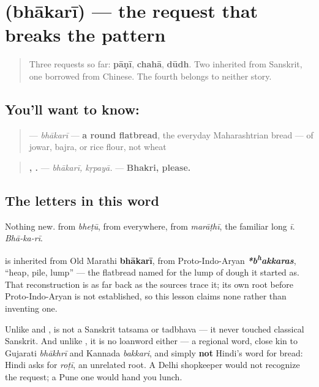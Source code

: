 \section[\texorpdfstring{\mr{भाकरी} (bhākarī)}{भाकरी (bhākarī)}]{ (bhākarī) — the request that breaks the pattern}

\label{lesson:MR-C10-bhakari}



\begin{quote}
Three requests so far: \textbf{pāṇī}, \textbf{chahā}, \textbf{dūdh}. Two inherited from Sanskrit, one borrowed from Chinese. The fourth belongs to neither story.
\end{quote}

\subsection*{You'll want to know: }
\begin{quote}
\textbf{} — \emph{bhākarī} — \textbf{a round flatbread}, the everyday Maharashtrian bread — of jowar, bajra, or rice flour, not wheat
\end{quote}

\begin{quote}
\textbf{, .} — \emph{bhākarī, kṛpayā.} — \textbf{Bhakri, please.}
\end{quote}

\subsection*{The letters in this word}
Nothing new. \textbf{} from \emph{bheṭū}, \textbf{} from everywhere, \textbf{} from \emph{marāṭhī}, \textbf{} the familiar long \emph{ī}. \emph{Bhā-ka-rī}.

\begin{cousinweb}
\textbf{} is inherited from Old Marathi \textbf{bhākarī}, from Proto-Indo-Aryan \emph{\textbf{*b\textsuperscript{h}akkaras}}, \textquotedblleft{}heap, pile, lump\textquotedblright{} — the flatbread named for the lump of dough it started as. That reconstruction is as far back as the sources trace it; its own root before Proto-Indo-Aryan is not established, so this lesson claims none rather than inventing one.

Unlike \textbf{} and \textbf{}, \textbf{} is not a Sanskrit tatsama or tadbhava — it never touched classical Sanskrit. And unlike \textbf{}, it is no loanword either — a regional word, close kin to Gujarati \emph{bhākhrī} and Kannada \emph{bakkari}, and simply \textbf{not} Hindi's word for bread: Hindi asks for \textbf{} \emph{roṭī}, an unrelated root. A Delhi shopkeeper would not recognize the request; a Pune one would hand you lunch.
\end{cousinweb}

